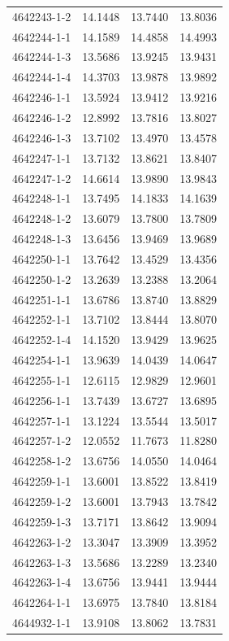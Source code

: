 \begin{longtable}{lrrr}
4642243-1-2 & 14.1448 & 13.7440 & 13.8036 \\
4642244-1-1 & 14.1589 & 14.4858 & 14.4993 \\
4642244-1-3 & 13.5686 & 13.9245 & 13.9431 \\
4642244-1-4 & 14.3703 & 13.9878 & 13.9892 \\
4642246-1-1 & 13.5924 & 13.9412 & 13.9216 \\
4642246-1-2 & 12.8992 & 13.7816 & 13.8027 \\
4642246-1-3 & 13.7102 & 13.4970 & 13.4578 \\
4642247-1-1 & 13.7132 & 13.8621 & 13.8407 \\
4642247-1-2 & 14.6614 & 13.9890 & 13.9843 \\
4642248-1-1 & 13.7495 & 14.1833 & 14.1639 \\
4642248-1-2 & 13.6079 & 13.7800 & 13.7809 \\
4642248-1-3 & 13.6456 & 13.9469 & 13.9689 \\
4642250-1-1 & 13.7642 & 13.4529 & 13.4356 \\
4642250-1-2 & 13.2639 & 13.2388 & 13.2064 \\
4642251-1-1 & 13.6786 & 13.8740 & 13.8829 \\
4642252-1-1 & 13.7102 & 13.8444 & 13.8070 \\
4642252-1-4 & 14.1520 & 13.9429 & 13.9625 \\
4642254-1-1 & 13.9639 & 14.0439 & 14.0647 \\
4642255-1-1 & 12.6115 & 12.9829 & 12.9601 \\
4642256-1-1 & 13.7439 & 13.6727 & 13.6895 \\
4642257-1-1 & 13.1224 & 13.5544 & 13.5017 \\
4642257-1-2 & 12.0552 & 11.7673 & 11.8280 \\
4642258-1-2 & 13.6756 & 14.0550 & 14.0464 \\
4642259-1-1 & 13.6001 & 13.8522 & 13.8419 \\
4642259-1-2 & 13.6001 & 13.7943 & 13.7842 \\
4642259-1-3 & 13.7171 & 13.8642 & 13.9094 \\
4642263-1-2 & 13.3047 & 13.3909 & 13.3952 \\
4642263-1-3 & 13.5686 & 13.2289 & 13.2340 \\
4642263-1-4 & 13.6756 & 13.9441 & 13.9444 \\
4642264-1-1 & 13.6975 & 13.7840 & 13.8184 \\
4644932-1-1 & 13.9108 & 13.8062 & 13.7831 \\

\end{longtable}

